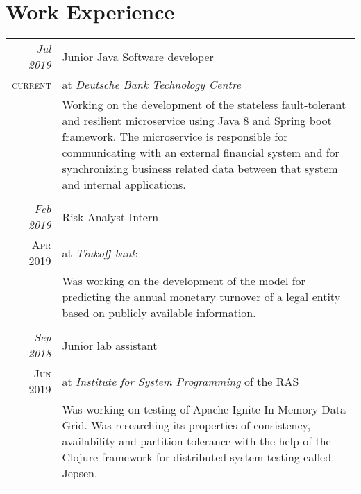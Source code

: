 \documentclass[a4paper,10pt]{article}
\begin{document}
\section{Work Experience}
\begin{tabular}{r|p{11cm}}

 \emph{Jul 2019} & Junior Java Software developer\\\textsc{current}&at \emph{Deutsche Bank Technology Centre}\\&\footnotesize{Working on the development of the stateless fault-tolerant and resilient microservice using Java 8 and Spring boot framework. The microservice is responsible for communicating with an external financial system and for synchronizing business related data between that system and internal applications.
 }\\\multicolumn{2}{c}{} \\
 
 \emph{Feb 2019} & Risk Analyst Intern\\\textsc{Apr 2019}&at \emph{Tinkoff bank}\\&\footnotesize{Was working on the development of the model for predicting the annual monetary turnover of a legal entity based on publicly available information.
 }\\\multicolumn{2}{c}{} \\

 \emph{Sep 2018} & Junior lab assistant \\\textsc{Jun 2019}&at \emph{Institute for System Programming} of the RAS\\&\footnotesize{Was working on testing of Apache Ignite In-Memory Data Grid. Was researching its properties of consistency, availability and partition tolerance with the help of the Clojure framework for distributed system testing called Jepsen.
 }\\\multicolumn{2}{c}{} \\
 
\end{tabular}
\end{document}
